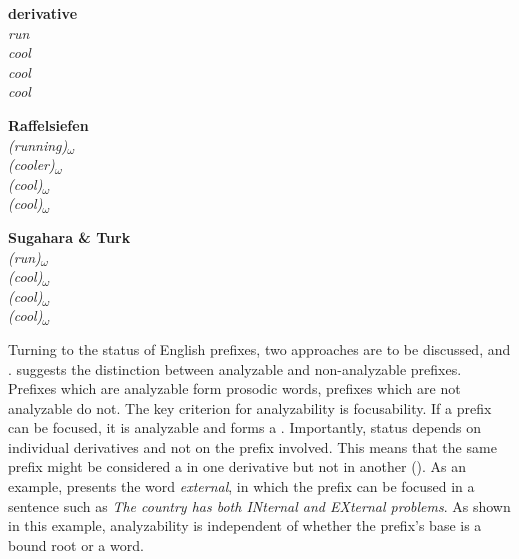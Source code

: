 \begin{multicols}{3}
	
	\begin{exe}
		
		\ex		
		\textbf{derivative}	\\
		\textit{run}	\\
		\textit{cool} 	\\
		\textit{cool}\\
		\textit{cool} \\			
		\columnbreak 
		
		\textbf{Raffelsiefen }	\\
		\textit{(running)\textsubscript{$\omega$}} 	\\
		\textit{(cooler)\textsubscript{$\omega$}} \\
		\textit{(cool)\textsubscript{$\omega$}} \\
		\textit{(cool)\textsubscript{$\omega$}} \\
		\columnbreak
		
		\textbf{Sugahara \& Turk}	\\
		\textit{(run)\textsubscript{$\omega$}} \\
		\textit{(cool)\textsubscript{$\omega$}} 	\\	
		\textit{(cool)\textsubscript{$\omega$}}\\
		\textit{(cool)\textsubscript{$\omega$}}	\\
		
	\end{exe}
	
\end{multicols}


Turning to the  status of English prefixes, two approaches are to be discussed, \cite{Wennerstrom.1993} and \cite{Raffelsiefen.1999}. \cite{Wennerstrom.1993} suggests the distinction between analyzable and non-analyzable prefixes. Prefixes which are analyzable form prosodic words, prefixes which are not analyzable do not. The key criterion for analyzability is focusability. If a prefix can be focused, it is analyzable and forms a . 
Importantly,  status depends on individual derivatives and not on the prefix involved. This means that the same prefix might be considered a  in one derivative but not in another (\citealt[314]{Wennerstrom.1993}). 
As an example, \citet[311]{Wennerstrom.1993} presents the word \textit{external}, in which the prefix  can be focused in a sentence such as \textit{The country has both INternal and EXternal problems}. As shown in this example, analyzability is independent of whether the prefix's base is a bound root or a word. 

